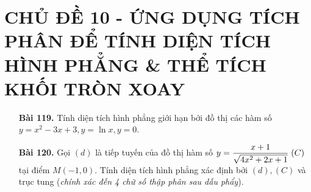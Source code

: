 \documentclass[12pt,a4paper]{article}
\begin{document}
\section*{CHỦ ĐỀ 10 - ỨNG DỤNG TÍCH PHÂN ĐỂ TÍNH DIỆN TÍCH HÌNH PHẲNG \& THỂ TÍCH KHỐI TRÒN XOAY}
\begin{enumerate}
    \item[\textbf{Bài 119.}] Tính diện tích hình phẳng giới hạn bởi đồ thị các hàm số $y=x^2-3x+3, y = \ln x,y=0$.
    \item[\textbf{Bài 120.}] Gọi $(d)$ là tiếp tuyến của đồ thị hàm số $y = \dfrac{x+1}{\sqrt{4x^2 + 2x + 1}} \thickspace (C)$ tại điểm $M(-1,0)$. Tính diện tích hình phẳng xác định bởi $(d),(C)$ và trục tung (\textit{chính xác đến 4 chữ số thập phân sau dấu phẩy}).
\end{enumerate}
\newpage
\end{document}
